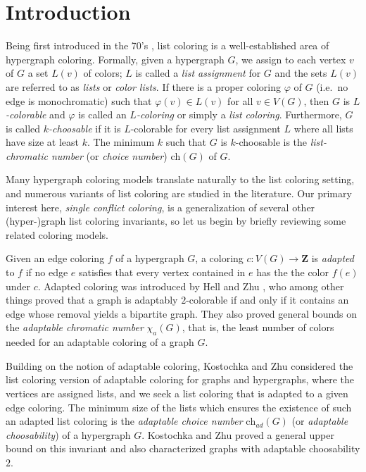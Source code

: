 \documentclass[12pt]{article}
\newcommand{\ch}{\mathrm{ch}}
\newcommand{\1}{\mathds{1}}
\begin{document}
\section{Introduction}
Being first introduced in the 70's \cite{ERT, Vizing}, list coloring is a well-established area of hypergraph coloring.
Formally, given a hypergraph $G$, we assign to each vertex $v$ of $G$ a set
        $L(v)$ of colors; $L$ is called a %
   \emph{list assignment} for $G$ and
    the sets $L(v)$ are referred
    to as \emph{lists} or \emph{color lists}.
    If there is a proper coloring $\varphi$ of $G$ (i.e.~no edge is monochromatic) such that 
    $\varphi(v) \in L(v)$ for all $v \in V(G)$, then
	$G$ is \emph{$L$-colorable} and $\varphi$
    is called an \emph{$L$-coloring} or simply a {\em list coloring}. 
	Furthermore, $G$ is
    called \emph{$k$-choosable} if it is $L$-colorable
    for every list assignment $L$ where all lists have size at least $k$. 
	The minimum $k$ such that $G$ is $k$-choosable is the 
	{\em list-chromatic number} (or {\em choice number})  $\ch(G)$ of $G$.

Many hypergraph coloring models  translate naturally to the list coloring setting, and numerous variants of list coloring are studied in the literature. Our primary interest here, {\em single conflict coloring}, is a generalization
of several other (hyper-)graph list coloring invariants, so let us begin by briefly reviewing some related coloring models.

Given an edge coloring $f$ of a hypergraph $G$, a coloring $c : V(G) \to \mathbf{Z}$ is {\em adapted} to $f$ if no 
edge $e$ satisfies that every vertex contained in $e$ has the the color $f(e)$ under $c$. 
Adapted coloring was introduced by
Hell and Zhu \cite{HellZhu}, who
among other things proved that a graph is adaptably $2$-colorable
if and only if it contains an edge whose removal yields a bipartite graph. 
They also proved general bounds on the 
{\em adaptable chromatic number} $\chi_a(G)$,
that is, the least number of colors needed for an adaptable coloring of a graph $G$.

Building on the notion of adaptable coloring, Kostochka and Zhu
\cite{KostochkaZhu} considered the list coloring version of adaptable coloring for graphs and hypergraphs, 
where the vertices are assigned lists, and we seek
a list coloring that is adapted to a given edge coloring. The minimum size of the lists which ensures the existence of such an
adapted list coloring is the {\em adaptable choice number}
$\ch_{ad}(G)$ (or {\em adaptable choosability}) of a hypergraph $G$. 
Kostochka and Zhu proved a general upper bound on this invariant and also characterized graphs with adaptable choosability $2$.
\end{document}
